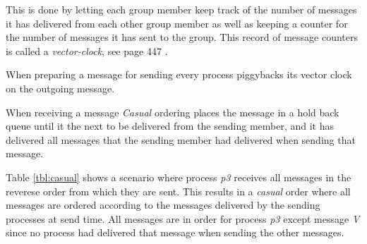 \documentclass[titlepage, twocolumn, a4paper, 10pt]{article}
\begin{document}
This is done by letting each group member keep track of the number of
messages it has delivered from each other group member as well as
keeping a counter for the number of messages it has sent to the group.
This record of message counters is called a \textit{vector-clock}, see
page 447 \cite{book:dist-syst}.

When preparing a message for sending every process piggybacks its
vector clock on the outgoing message.

When receiving a message \textit{Casual} ordering places the message
in a hold back queue until it the next to be delivered from the
sending member, and it has delivered all messages that the sending
member had delivered when sending that message.

Table \ref{tbl:casual} shows a scenario where process \textit{p3} receives all messages in the reverese order from which they are sent. This results in a \textit{casual} order where all messages are ordered according to the messages delivered by the sending processes at send time. All messages are in order for process \textit{p3} except message \textit{V} since no process had delivered that message when sending the other messages.
\end{document}
